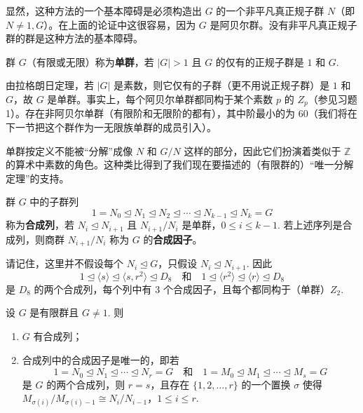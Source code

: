 显然，这种方法的一个基本障碍是必须构造出 \(G\) 的一个非平凡真正规子群 \(N\)（即 \(N \neq 1, G\)）。在上面的论证中这很容易，因为 \(G\) 是阿贝尔群。没有非平凡真正规子群的群是这种方法的基本障碍。

\begin{definition}
群 \(G\)（有限或无限）称为\textbf{单群}，若 \(|G| > 1\) 且 \(G\) 的仅有的正规子群是 \(1\) 和 \(G\).
\end{definition}

由拉格朗日定理，若 \(|G|\) 是素数，则它仅有的子群（更不用说正规子群）是 \(1\) 和 \(G\)，故 \(G\) 是单群。事实上，每个阿贝尔单群都同构于某个素数 \(p\) 的 \(Z_p\)（参见习题 1）。存在非阿贝尔单群（有限阶和无限阶的都有），其中阶最小的为 60（我们将在下一节把这个群作为一无限族单群的成员引入）。

单群按定义不能被“分解”成像 \(N\) 和 \(G/N\) 这样的部分，因此它们扮演着类似于 \(\mathbb{Z}\) 的算术中素数的角色。这种类比得到了我们现在要描述的（有限群的）“唯一分解定理”的支持。

\begin{definition}
群 \(G\) 中的子群列
\[
1 = N_0 \trianglelefteq N_1 \trianglelefteq N_2 \trianglelefteq \cdots \trianglelefteq N_{k-1} \trianglelefteq N_k = G
\]
称为\textbf{合成列}，若 \(N_i \trianglelefteq N_{i+1}\) 且 \(N_{i+1}/N_i\) 是单群，\(0 \leq i \leq k-1\). 若上述序列是合成列，则商群 \(N_{i+1}/N_i\) 称为 \(G\) 的\textbf{合成因子}。
\end{definition}

请记住，这里并不假设每个 \(N_i \trianglelefteq G\)，只假设 \(N_i \trianglelefteq N_{i+1}\). 因此
\[
1 \trianglelefteq \langle s \rangle \trianglelefteq \langle s, r^2 \rangle \trianglelefteq D_8 \quad \text{和} \quad 1 \trianglelefteq \langle r^2 \rangle \trianglelefteq \langle r \rangle \trianglelefteq D_8
\]
是 \(D_8\) 的两个合成列，每个列中有 3 个合成因子，且每个都同构于（单群）\(Z_2\).

\begin{theorem}\label{thm:3.22}
设 \(G\) 是有限群且 \(G \neq 1\). 则

\begin{enumerate}[label=(\arabic*)]
\item \(G\) 有合成列；

\item 合成列中的合成因子是唯一的，即若
\[
1 = N_0 \trianglelefteq N_1 \trianglelefteq \cdots \trianglelefteq N_r = G \quad \text{和} \quad 1 = M_0 \trianglelefteq M_1 \trianglelefteq \cdots \trianglelefteq M_s = G
\]
是 \(G\) 的两个合成列，则 \(r = s\)，且存在 \(\{1, 2, \ldots, r\}\) 的一个置换 \(\sigma\) 使得 \(M_{\sigma(i)}/M_{\sigma(i)-1} \cong N_i/N_{i-1}\)，\(1 \leq i \leq r\).
\end{enumerate}
\end{theorem}

